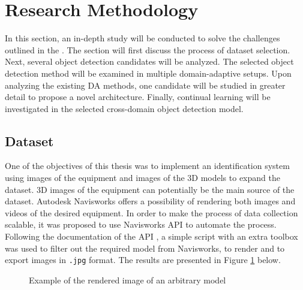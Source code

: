 \section{Research Methodology}
\label{Methodology}

In this section, an in-depth study will be conducted to solve the challenges outlined in the . The section will first discuss the process of dataset selection. Next, several object detection candidates will be analyzed.  The selected object detection method will be examined in multiple domain-adaptive setups. Upon analyzing the existing DA methods, one candidate will be studied in greater detail to propose a novel architecture. Finally, continual learning will be investigated in the selected cross-domain object detection model. 


\subsection{Dataset}
\label{datasets} 
One of the objectives of this thesis was to implement an identification system using images of the equipment and images of the 3D models to expand the dataset. 3D images of the equipment can potentially be the main source of the dataset. Autodesk Navisworks offers a possibility of rendering both images and videos of the desired equipment. In order to make the process of data collection scalable, it was proposed to use Navisworks API to automate the process. Following the documentation of the API  \cite{navisworks}, a simple script with an extra toolbox was used to filter out the required model from Navisworks, to render and to export images in \texttt{.jpg} format. The results are presented in Figure \ref{navisworks} below.

\begin{figure}[htb]
    \centering
    \qquad
    \caption{Example of the rendered image of an arbitrary model}\label{navisworks}%
\end{figure}
\FloatBarrier

